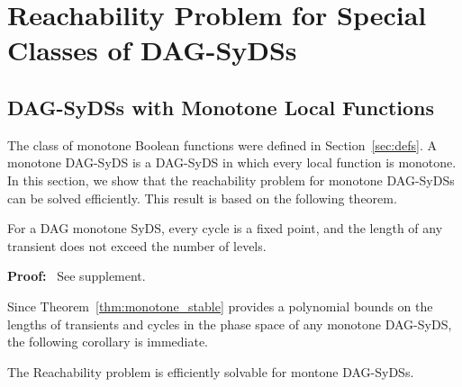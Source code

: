 \section{Reachability Problem for Special Classes of DAG-SyDSs}
\label{sec:reach_special}

\subsection{DAG-SyDSs with Monotone Local Functions}
\label{sse:monotoner_functions}

The class of monotone Boolean functions were defined in
Section~\ref{sec:defs}.
A monotone DAG-SyDS is a DAG-SyDS in which every local
function is monotone.
In this section, we show that the reachability problem
for monotone DAG-SyDSs can be solved efficiently.
This result is based on the following theorem. 

\begin{theorem}\label{thm:monotone_stable}
For a DAG monotone SyDS, every cycle is a fixed point, 
and the length of any transient does not exceed the number of levels.
\end{theorem}

\noindent
\textbf{Proof:}~ See supplement.

\iffalse
\noindent
\textbf{Proof:}~ 
By induction on the number of levels for each level $i$, 
each level $i$ node is stable after at most $i$ steps.

From Lemma \ref{lem:level_zero_nodes}, every level 0 node is either
stable or alternating  at time 1.  The complement function is not
monotone, so a  level 0 node is cannot be alternating, and thus is
stable at time 1.

Suppose that all the incoming edges to a given node $v$ have stable
values at time $t$.  From Lemma \ref{lem:all_inputs_stable}, node
$v$ is either stable or alternating  at time $t+1$.  Since the local
transition function for node $v$ is monotone, and all the incoming
edges have stable values at time $t$, node $v$ is stable at time
$t+1$. \QED

We observe that that for every $L \geq 0$, there exists a DAG
monotone SyDS with a transient of length $L$.  Consider the SyDS
whose underlying graph is a directed chain of $L$ nodes.  The local
transition function of the level 0 node is the constant 1, and of
every other node is the {\em or} of its value and the value from
the incoming edge.  The configuration of all zeros takes $L$ steps
to reach the fixed point of all ones.
\fi

Since Theorem~\ref{thm:monotone_stable} provides a polynomial bounds
on the lengths of transients and cycles in the phase space of any
monotone DAG-SyDS, the following corollary is immediate.

\begin{corollary}\label{cor:poly_monotone_dag_syds}
The Reachability problem is efficiently solvable for montone
DAG-SyDSs.
\end{corollary}


